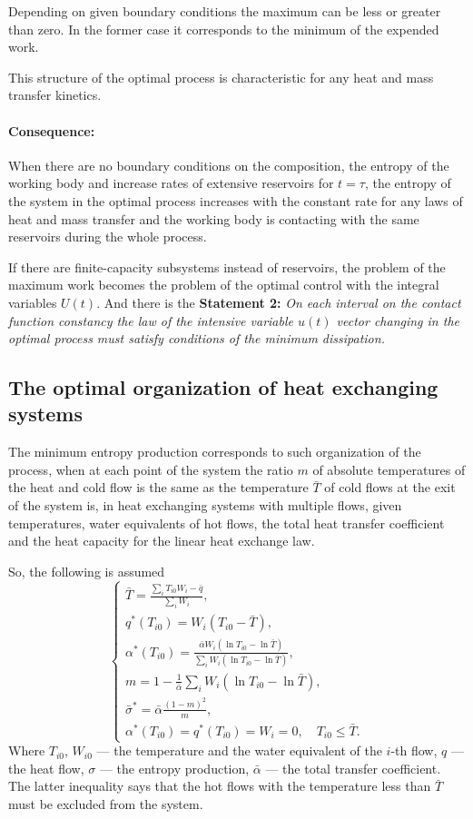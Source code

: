 \documentclass[epjST]{svjour}
\begin{document}
Depending on given boundary conditions the maximum can be less or greater than zero. In the former case it corresponds to the minimum of the expended work.

This structure of the optimal process is characteristic for any heat and mass transfer kinetics.

\paragraph{Consequence:} When there are no boundary conditions on the composition, the entropy of the working body and increase rates of extensive reservoirs for $t=\tau$, the entropy of the system in the optimal process increases with the constant rate for any laws of heat and mass transfer and the working body is contacting with the same reservoirs during the whole process.

If there are finite-capacity subsystems instead of reservoirs, the problem of the maximum work becomes the problem of the optimal control with the integral variables $U(t)$. And there is the \textbf{Statement 2:} \textit{On each interval on the contact function constancy the law of the intensive variable $u(t)$ vector changing in the optimal process must satisfy conditions of the minimum dissipation.}

\subsection*{The optimal organization of heat exchanging systems}

The minimum entropy production corresponds to such organization of the process, when at each point of the system the ratio $m$ of absolute temperatures of the heat and cold flow is the same as the temperature $\bar{T}$ of cold flows at the exit of the system is, in heat exchanging systems with multiple flows, given temperatures, water equivalents of hot flows, the total heat transfer coefficient and the heat capacity for the linear heat exchange law.

So, the following is assumed
\[
\begin{cases}
\bar{T} = \frac{\sum\limits_i{T_{i0}W_i}-\bar{q}}{\sum\limits_i{W_i}},\\
q^*(T_{i0}) = W_i(T_{i0} - \bar{T}),\\
\alpha^*(T_{i0}) = \frac{\bar{\alpha}W_i(\ln{T_{i0}}-\ln{\bar{T}})}{\sum\limits_i{W_i(\ln{T_{i0}}-\ln{\bar{T}})}},\\
m = 1 - \frac{1}{\bar{\alpha}}\sum\limits_i{W_i(\ln{T_{i0}}-\ln{\bar{T}})},\\
\bar{\sigma}^* = \bar{\alpha}\frac{(1-m)^2}{m},\\
\alpha^*(T_{i0}) = q^*(T_{i0}) = W_i = 0,\quad T_{i0} \leq \bar{T}.
\end{cases}
\]
Where $T_{i0}$, $W_{i0}$ --- the temperature and the water equivalent of the $i$-th flow, $q$ --- the heat flow, $\sigma$ --- the entropy production, $\bar{\alpha}$ --- the total transfer coefficient. The latter inequality says that the hot flows with the temperature less than $\bar{T}$ must be excluded from the system.
\end{document}
